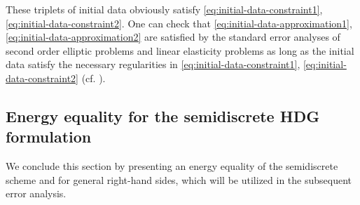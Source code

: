\documentclass[10pt,letterpaper]{amsart}
\theoremstyle{plain} %
\theoremstyle{remark} %
\begin{document}
These triplets of initial data obviously satisfy \eqref{eq:initial-data-constraint1}, \eqref{eq:initial-data-constraint2}. One can check that \eqref{eq:initial-data-approximation1}, \eqref{eq:initial-data-approximation2} are satisfied by the standard error analyses of second order elliptic problems and linear elasticity problems as long as the initial data satisfy the necessary regularities in \eqref{eq:initial-data-constraint1}, \eqref{eq:initial-data-constraint2} (cf. \cite{Cockburn:2010,Qiu-Shen-Shi:2018,Du-Sayas:2020a}).  


\subsection{Energy equality for the semidiscrete HDG formulation}\label{ss:stability}
%
We conclude this section by presenting an energy equality of the semidiscrete scheme and for general right-hand sides, which will be utilized in the subsequent error analysis.
%
\end{document}
